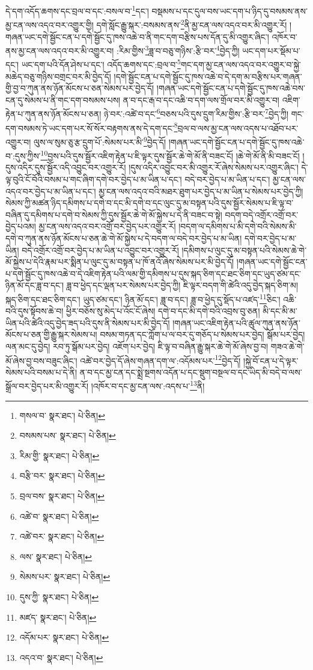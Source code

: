 དེ་དག་འདོད་ཆགས་དང་བྲལ་བ་དང་:བསལ་བ་\footnote{གསལ་བ་  སྣར་ཐང་།  པེ་ཅིན། }དང་། བསྡམས་པ་དང་དུལ་བས་ཡང་དག་པ་ཉིད་དུ་བསམས་ནས་མྱ་ངན་ལས་འདའ་བར་འགྱུར་གྱི། དགེ་སློང་རྒྱུ་སྐར་:བསམས་ནས་\footnote{བསམས་པས་  སྣར་ཐང་།  པེ་ཅིན། }ནི་མྱ་ངན་ལས་འདའ་བར་མི་འགྱུར་རོ། །གཞན་ཡང་དགེ་སྦྱོང་ངན་པ་དགེ་སྦྱོང་དུ་ཁས་འཆེ་བ་ནི་གང་དག་བརྩིས་པས་དོན་དུ་མི་འགྱུར་ཞིང་། འཁོར་བ་ནས་མྱ་ངན་ལས་འདའ་བར་མི་འགྱུར་བ། :རིམ་གྱིས་\footnote{རིམ་གྱི་  སྣར་ཐང་།  པེ་ཅིན། }ཟླ་བ་བཅུ་གཉིས་:རྩི་བར་\footnote{བརྩི་བར་  སྣར་ཐང་།  པེ་ཅིན། }བྱེད་ཀྱི། ཡང་དག་པར་སྡོམ་པ་དང་། ཡང་དག་པའི་དོན་ཤེས་པ་དང་། འདོད་ཆགས་དང་:བྲལ་བ་\footnote{བྲལ་བས་  སྣར་ཐང་།  པེ་ཅིན། }གང་དག་མྱ་ངན་ལས་འདའ་བར་འགྱུར་བ་སྐྱེ་མཆེད་བཅུ་གཉིས་བགྲང་བར་མི་བྱེད་དོ། །དགེ་སྦྱོང་ངན་པ་དགེ་སྦྱོང་དུ་ཁས་འཆེ་བ་དེ་དག་མ་བརྩིས་པར་གཞན་གྱི་བྱ་བ་ཀུན་ནས་ཉོན་མོངས་པ་ཅན་སེམས་པར་བྱེད་དོ། །གཞན་ཡང་དགེ་སྦྱོང་ངན་པ་དགེ་སྦྱོང་དུ་ཁས་འཆེ་བས་ངན་དུ་སེམས་པ་ནི་གང་དག་བསམས་པས། ན་བ་དང་རྒ་བ་དང་འཆི་བ་དག་ལས་གྲོལ་བར་མི་འགྱུར་བ། འཇིག་རྟེན་པ་ཀུན་ནས་ཉོན་མོངས་པ་ཅན། ཉེ་བར་:འཚེ་བ་དང་\footnote{འཚེ་བ་  སྣར་ཐང་།  པེ་ཅིན། }བཅས་པའི་དུས་དྲུག་རིམ་གྱིས་:རྩི་བར་\footnote{འཚེ་བར་  སྣར་ཐང་།  པེ་ཅིན། }བྱེད་ཀྱི། གང་དག་བསམས་ཏེ་ཡང་དག་པར་སོ་སོར་བརྟགས་ནས་དེ་དག་དང་\footnote{ལས་  སྣར་ཐང་།  པེ་ཅིན། }བྲལ་བ་ལས་མྱ་ངན་ལས་འདས་པ་འཐོབ་པར་འགྱུར་བ། ལུས་ལ་སུམ་ཅུ་རྩ་དྲུག་པོ་:སེམས་པར་མི་\footnote{སེམས་པར་  སྣར་ཐང་།  པེ་ཅིན། }བྱེད་དོ། །གཞན་ཡང་དགེ་སྦྱོང་ངན་པ་དགེ་སྦྱོང་དུ་ཁས་འཆེ་བ་:དུས་ཀྱིས་\footnote{དུས་ཀྱི་  སྣར་ཐང་།  པེ་ཅིན། }བྱས་པའི་དུས་སྦྱོར་འཇིག་རྟེན་པ་ཇི་ལྟར་དུས་སྦྱོར་ཆེ་གེ་མོ་ནི་བཟང་ངོ། །ཆེ་གེ་མོ་ནི་མི་བཟང་ངོ། །དུས་འདིར་དུས་སྦྱོར་འདི་འབྱུང་བར་འགྱུར་རོ། །དུས་འདིར་འབྱུང་བར་མི་འགྱུར་རོ་ཞེས་སེམས་པར་འགྱུར་ཞིང་། དེ་ལྟ་བུའི་ངོ་བོའི་བསམ་པ་གང་ཞིག་དགེ་བར་བྱེད་པ་མ་ཡིན་པ་དང་། བདེ་བར་བྱེད་པ་མ་ཡིན་པ་དང་། མྱ་ངན་ལས་འདའ་བར་བྱེད་པ་མ་ཡིན་པ་དང་། མྱ་ངན་ལས་འདའ་བའི་མཐར་ཐུག་པར་བྱེད་པ་མ་ཡིན་པ་སེམས་པར་བྱེད་ཀྱི། སེམས་ཀྱི་མཚན་ཉིད་དམིགས་པ་དགེ་བ་དང་མི་དགེ་བ་དང་ལུང་དུ་མ་བསྟན་པའི་དུས་སྦྱོར་སེམས་པ་ཇི་ལྟ་བ་བཞིན་དུ་དམིགས་པ་དགེ་བ་སེམས་ཀྱི་དུས་སྦྱོར་ཆེ་གེ་མོ་སྐྱེས་པ་དེ་ནི་བཟང་བ་སྟེ། བདག་བདེ་འགྲོར་འགྲོ་བར་བྱེད་པའམ། མྱ་ངན་ལས་འདའ་བར་འགྲོ་བར་བྱེད་པར་འགྱུར་རོ། །བདག་ལ་དམིགས་པ་མི་དགེ་བའི་སེམས་མི་དགེ་བ་ཀུན་ནས་ཉོན་མོངས་པ་ཅན་ཆེ་གེ་མོ་སྐྱེས་པ་དེ་བདག་ལ་བདེ་བར་བྱེད་པ་མ་ཡིན། དགེ་བར་བྱེད་པ་མ་ཡིན། བདེ་འགྲོར་འགྲོ་བར་བྱེད་པ་མ་ཡིན་པ་འབྱུང་བར་འགྱུར་རོ། །དམིགས་པ་ལུང་དུ་མ་བསྟན་པའི་སེམས་ཆེ་གེ་མོ་སྐྱེས་པ་དེའི་རྣམ་པར་སྨིན་པ་ལུང་དུ་མ་བསྟན་པ་ཁོ་ནའོ་ཞེས་སེམས་པར་མི་བྱེད་དོ། །གཞན་ཡང་དགེ་སྦྱོང་ངན་པ་དགེ་སྦྱོང་དུ་ཁས་འཆེ་བ་དེ་འཇིག་རྟེན་པའི་ལམ་གྱི་དམིགས་པ་དུས་སྐད་ཅིག་དང་ཐང་ཅིག་དང་ཡུད་ཙམ་དང་ཉིན་མོ་དང་ཟླ་བ་དང་། ཟླ་བ་ཕྱེད་དང་ལྡན་པར་སེམས་པར་བྱེད་ཀྱི། ཇི་ལྟར་བདག་གི་ཚེའི་འདུ་བྱེད་སྐད་ཅིག་མ། སྐད་ཅིག་དང་ཐང་ཅིག་དང་། ཡུད་ཙམ་དང་། ཉིན་མོ་དང་། ཟླ་བ་དང་། ཟླ་བ་ཕྱེད་དུ་སྡོད་པ་འཛད་\footnote{མཛད་  སྣར་ཐང་།  པེ་ཅིན། }ཅིང་། འཆི་བའི་དུས་སྟོབས་ཆེ་བ། ཕྱིར་བཅོས་སུ་མེད་པ་འོང་ངོ་ཞེས། དགེ་བ་དང་མི་དགེ་བའི་འབྲས་བུ་ཅན། མི་དང་མི་མ་ཡིན་པའི་ཚེའི་འདུ་བྱེད་ཟད་པའི་དུས་ནི་སེམས་པར་མི་བྱེད་དོ། །གཞན་ཡང་འཇིག་རྟེན་པའི་ཚུལ་ཀུན་ནས་ཉོན་མོངས་པ་ཅན་གྱི་རྒྱུ་སྐར་སེམས་པ། བསམ་གཏན་དང་ཀློག་པ་ལ་བར་དུ་གཅོད་པ་སེམས་པར་བྱེད། སྒོམ་པར་བྱེད། ལན་མང་དུ་བྱེད། རབ་ཏུ་སྒོམ་པར་བྱེད། འཇོག་པར་བྱེད། ཇི་ལྟ་བ་བཞིན་རྒྱུ་སྐར་ཆེ་གེ་མོ་ཞེས་བྱ་བ། གཟའ་ཆེ་གེ་མོ་ཞེས་བྱ་བས་བཟུང་ཞིང་། འཚེ་བར་བྱེད་དོ་ཞེས་གཞན་དག་ལ་:འདོམས་པར་\footnote{འདོམ་པར་  སྣར་ཐང་།  པེ་ཅིན། }བྱེད་དོ། །སྐྱེ་བོ་ངན་པ་དེ་ལྟར་སེམས་པའི་བསམ་པ་དེ་ནི། ན་བ་དང་མྱ་ངན་དང་སྨྲེ་སྔགས་འདོན་པ་དང་སྡུག་བསྔལ་བ་དང་ཡིད་མི་བདེ་བ་ལས་སྒྲོལ་བར་བྱེད་པར་མི་འགྱུར་རོ། །འཁོར་བ་དང་མྱ་ངན་ལས་:འདས་པ་\footnote{འདའ་བ་  སྣར་ཐང་།  པེ་ཅིན། }ནི། 